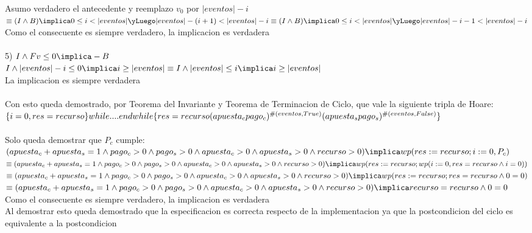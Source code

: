 \documentclass[10pt,a4paper]{article}
\begin{document}
Asumo verdadero el antecedente y reemplazo $v _0$ por $ |eventos|-i $\\
$\equiv (I \land B ) \implica 0 \leq i < |eventos| \yLuego |eventos|-(i+1) < |eventos|-i \equiv (I \land B ) \implica 0 \leq i < |eventos| \yLuego |eventos|-i-1 < |eventos|-i $\\

Como el consecuente es siempre verdadero, la implicacion es verdadera\\\\
%
%
%
%
5) $I  \land Fv \leq 0 \implica -B$\\

$ I  \land |eventos| - i \leq 0 \implica i \geq |eventos| \equiv I  \land |eventos| \leq i \implica i \geq |eventos|$\\

La implicacion es siempre verdadera\\\\


Con esto queda demostrado, por Teorema del Invariante y Teorema de Terminacion de Ciclo, que vale la siguiente tripla de Hoare:\\
$\{i=0, res=recurso\}  while....endwhile  \{res = recurso(apuesta _c  pago _c)^{\symbol{35}(eventos, True)} (apuesta _s pago _s)^{\symbol{35}(eventos, False)}\}$\\\\

Solo queda demostrar que $P _c $ cumple:\\

${(apuesta _c + apuesta _s = 1 \land pago _c > 0 \land pago _s > 0 \land apuesta _c > 0 \land apuesta _s > 0 \land recurso > 0)} \implica\\ wp(res:=recurso; i:=0, P _c)$\\

${\equiv(apuesta _c + apuesta _s = 1 \land pago _c > 0 \land pago _s > 0 \land apuesta _c > 0 \land apuesta _s > 0 \land recurso > 0)} \implica\\ wp(res:=recurso; wp(i:=0, res=recurso \land i=0))$\\

${\equiv(apuesta _c + apuesta _s = 1 \land pago _c > 0 \land pago _s > 0 \land apuesta _c > 0 \land apuesta _s > 0 \land recurso > 0)} \implica\\ wp(res:=recurso; res=recurso \land 0=0)$\\

${\equiv(apuesta _c + apuesta _s = 1 \land pago _c > 0 \land pago _s > 0 \land apuesta _c > 0 \land apuesta _s > 0 \land recurso > 0)} \implica\\ recurso=recurso \land 0=0$\\

Como el consecuente es siempre verdadero, la implicacion es verdadera\\

Al demostrar esto queda demostrado que la especificacion es correcta respecto de la implementacion ya que la postcondicion del ciclo es equivalente a la postcondicion
\end{document}

